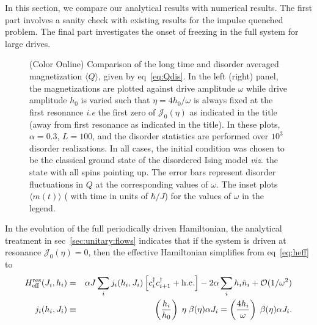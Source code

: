 \documentclass[a4paper,10pt]{article}
\begin{document}
In this section, we compare our analytical results with numerical results. The first part involves a sanity check with existing results for the impulse quenched problem. The final part investigates the onset of freezing in the full system for large drives.
\begin{figure}
\caption{(Color Online) Comparison of the long time and disorder averaged magnetization $\langle Q \rangle$, given by eq~\ref{eq:Qdis}. In the left (right) panel, the magnetizations are plotted against drive amplitude $\omega$ while drive amplitude $h_0$ is varied such that $\eta=4h_0/\omega$ is always fixed at the first resonance  \textit{i.e} the first zero of $\mathcal{J}_0(\eta)$ as indicated in the title (away from first resonance as indicated in the title). In these plots, $\alpha=0.3$, $L=100$,  and the disorder statistics are performed over $10^3$ disorder realizations. In all cases, the initial condition was chosen to be the classical ground state of the disordered Ising model \textit{viz.} the state with all spins pointing up. The error bars represent disorder fluctuations in $Q$ at the corresponding values of $\omega$. The inset plots $\langle m(t)\rangle $  ( with time in units of $\hbar/J$) for the values of $\omega$ in the legend.}
\label{fig:multh0:q}
\end{figure}
In the evolution of the full periodically driven Hamiltonian, the analytical treatment in sec~\ref{sec:unitary:flows} indicates that if the system is driven at resonance $\mathcal{J}_0(\eta)=0$, then the effective Hamiltonian simplifies from eq~\ref{eq:heff} to
\begin{eqnarray}
\label{eq:heff:resonance}
H^{\rm res}_{\rm eff}(J_i,h_i) &   =  & \alpha J\sum_i j_i(h_i,J_i)\left[c^\dagger_i c^\dagger_{i+1} + \rm{h.c.}\right] -2\alpha\sum_i h_i \hat{n}_i 					  +\mathcal{O}(1/\omega^2) \nonumber \\
j_i(h_i,J_i)            		       & \equiv& \;  \left(\frac{h_i}{h_0}\right)\;\eta \;\beta(\eta) \alpha J_i = \left(\frac{4 h_i}{\omega}\right) \;\beta(\eta) \alpha J_i.
\end{eqnarray}
\end{document}
